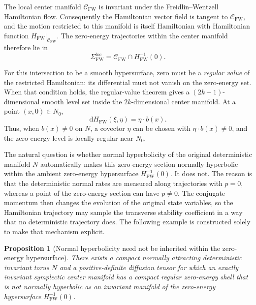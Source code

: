 \documentclass[11pt]{article}
\newtheorem{proposition}[theorem]{Proposition}
\theoremstyle{definition}
\theoremstyle{remark}
\newcommand{\C}{\mathcal{C}}
\newcommand{\Hs}{H_{\mathrm{FW}}}
\newcommand{\dd}{\mathrm{d}}
\begin{document}
The local center manifold $\C_{\mathrm{FW}}$ is invariant under the Freidlin--Wentzell Hamiltonian flow.  Consequently the Hamiltonian vector field is tangent to $\C_{\mathrm{FW}}$, and the motion restricted to this manifold is itself Hamiltonian with Hamiltonian function $\Hs|_{\C_{\mathrm{FW}}}$.  The zero-energy trajectories within the center manifold therefore lie in
\begin{equation}
\Sigma_{\mathrm{FW}}^{\mathrm{loc}}
=
\C_{\mathrm{FW}}\cap\Hs^{-1}(0).
\label{eq:local-fw-nhim}
\end{equation}

For this intersection to be a smooth hypersurface, zero must be a \emph{regular value} of the restricted Hamiltonian: its differential must not vanish on the zero-energy set.  When that condition holds, the regular-value theorem gives a $(2k-1)$-dimensional smooth level set inside the $2k$-dimensional center manifold.  At a point $(x,0)\in N_0$,
\begin{equation}
\dd\Hs(\xi,\eta)=\eta\cdot b(x).
\label{eq:dH-N0}
\end{equation}
Thus, when $b(x)\ne0$ on $N$, a covector $\eta$ can be chosen with $\eta\cdot b(x)\ne0$, and the zero-energy level is locally regular near $N_0$.

The natural question is whether normal hyperbolicity of the original deterministic manifold $N$ automatically makes this zero-energy section normally hyperbolic within the ambient zero-energy hypersurface $\Hs^{-1}(0)$.  It does not.  The reason is that the deterministic normal rates are measured along trajectories with $p=0$, whereas a point of the zero-energy section can have $p\ne0$.  The conjugate momentum then changes the evolution of the original state variables, so the Hamiltonian trajectory may sample the transverse stability coefficient in a way that no deterministic trajectory does.  The following example is constructed solely to make that mechanism explicit.

\begin{proposition}[Normal hyperbolicity need not be inherited within the zero-energy hypersurface]
\label{prop:counterexample}
There exists a compact normally attracting deterministic invariant torus $N$ and a positive-definite diffusion tensor for which an exactly invariant symplectic center manifold has a compact regular zero-energy shell that is not normally hyperbolic as an invariant manifold of the zero-energy hypersurface $\Hs^{-1}(0)$.
\end{proposition}
\end{document}
